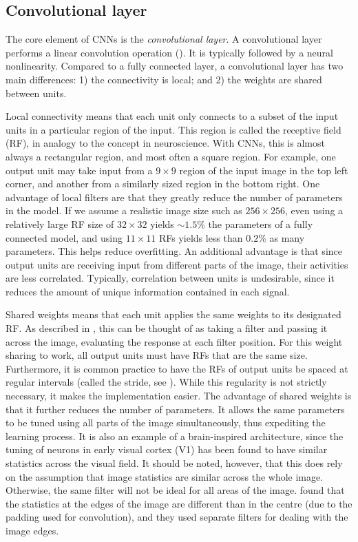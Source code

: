 \subsection{Convolutional layer}

The core element of CNNs is the \emph{convolutional layer}.
A convolutional layer performs a linear convolution operation ().
It is typically followed by a neural nonlinearity.
Compared to a fully connected layer,
a convolutional layer has two main differences:
1) the connectivity is local; and
2) the weights are shared between units.

Local connectivity means that each unit only connects to a subset of the input units
in a particular region of the input.
This region is called the receptive field (RF),
in analogy to the concept in neuroscience.
With CNNs, this is almost always a rectangular region,
and most often a square region.
For example, one output unit may take input from a $9 \times 9$ region of the
input image in the top left corner,
and another from a similarly sized region in the bottom right.
One advantage of local filters are that they greatly reduce
the number of parameters in the model.
If we assume a realistic image size such as $256 \times 256$,
even using a relatively large RF size of $32 \times 32$ yields
$\sim 1.5\%$ the parameters of a fully connected model,
and using $11 \times 11$ RFs yields less than $0.2\%$ as many parameters.
This helps reduce overfitting.
An additional advantage is that since output units are receiving input from
different parts of the image,
their activities are less correlated.
Typically, correlation between units is undesirable,
since it reduces the amount of unique information contained in each signal.

Shared weights means that each unit applies the same weights to its
designated RF.
As described in ,
this can be thought of as taking a filter and passing it across the image,
evaluating the response at each filter position.
For this weight sharing to work,
all output units must have RFs that are the same size.
Furthermore, it is common practice to have the RFs of
output units be spaced at regular intervals
(called the stride, see ).
While this regularity is not strictly necessary,
it makes the implementation easier.
The advantage of shared weights is that it further reduces the number of parameters.
It allows the same parameters to be tuned using all parts of the image simultaneously,
thus expediting the learning process.
It is also an example of a brain-inspired architecture,
since the tuning of neurons in early visual cortex (V1)
has been found to have similar statistics across the visual field.
It should be noted, however, that this does rely on the assumption
that image statistics are similar across the whole image.
Otherwise, the same filter will not be ideal for all areas of the image.
\textcite{Krizhevsky2012} found that the statistics at the edges of the image
are different than in the centre (due to the padding used for convolution),
and they used separate filters for dealing with the image edges.


